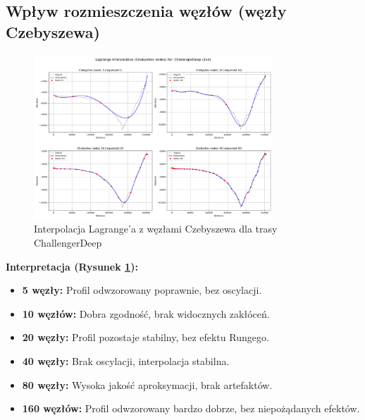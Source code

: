 \documentclass[11pt,a4paper]{article}
\begin{document}
\subsection{Wpływ rozmieszczenia węzłów (węzły Czebyszewa)}
\begin{figure}[H]
    \centering
    \includegraphics[width=0.8\textwidth]{plots/ChallengerDeep_Lagrange_Chebyshev_2x2.png}
    \caption{Interpolacja Lagrange'a z węzłami Czebyszewa dla trasy ChallengerDeep}
    \label{fig:challengerdeep_chebyshev}
\end{figure}
\textbf{Interpretacja (Rysunek \ref{fig:challengerdeep_chebyshev}):} 
\begin{itemize}
    \item \textbf{5 węzły:} Profil odwzorowany poprawnie, bez oscylacji.
    \item \textbf{10 węzłów:} Dobra zgodność, brak widocznych zakłóceń.
    \item \textbf{20 węzły:} Profil pozostaje stabilny, bez efektu Rungego.
    \item \textbf{40 węzły:} Brak oscylacji, interpolacja stabilna.
    \item \textbf{80 węzły:} Wysoka jakość aproksymacji, brak artefaktów.
    \item \textbf{160 węzłów:} Profil odwzorowany bardzo dobrze, bez niepożądanych efektów.
\end{itemize}
\end{document}
